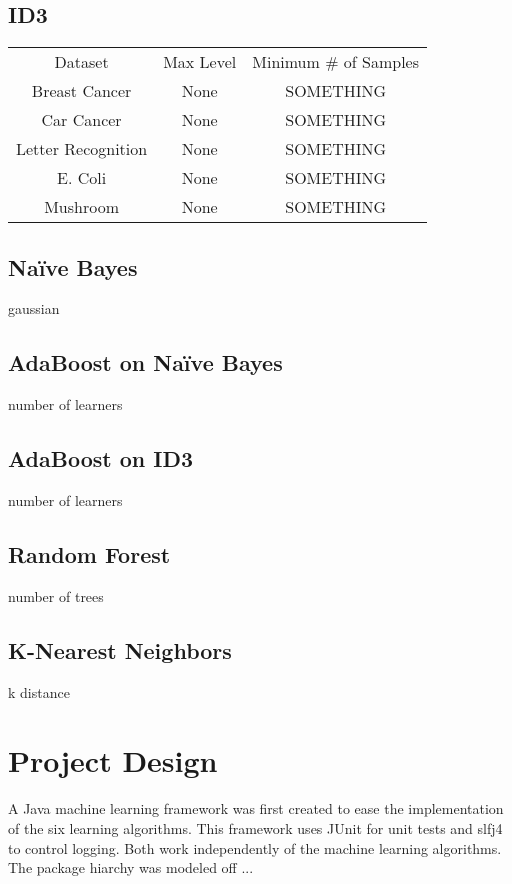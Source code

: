 \documentclass[11pt]{article}
\begin{document}
\subsection{ID3}
\begin{tabular}{ |c|c|c| }
  Dataset            & Max Level & Minimum \# of Samples \\
  Breast Cancer      & None      & SOMETHING            \\
  Car Cancer         & None      & SOMETHING            \\
  Letter Recognition & None      & SOMETHING            \\
  E. Coli            & None      & SOMETHING            \\
  Mushroom           & None      & SOMETHING
\end{tabular}

\subsection{Naïve Bayes}
gaussian

\subsection{AdaBoost on Naïve Bayes}
number of learners

\subsection{AdaBoost on ID3}
number of learners

\subsection{Random Forest}
number of trees

\subsection{K-Nearest Neighbors}
k
distance

\section{Project Design}
A Java machine learning framework was first created to ease the implementation of the six learning algorithms. This framework uses JUnit for unit tests and slfj4 to control logging. Both work independently of the machine learning algorithms. The package hiarchy was modeled off ...
\end{document}
